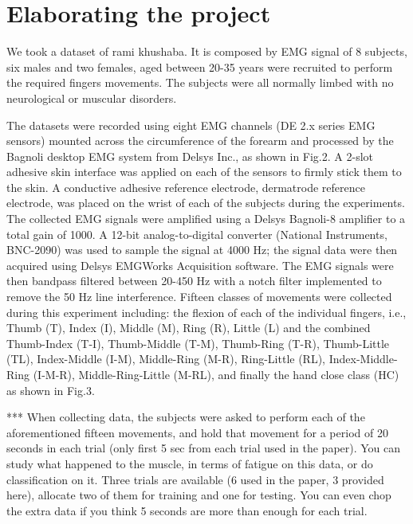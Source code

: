 \documentclass[journal]{IEEEtran}
\begin{document}
\section{Elaborating the project}
We took a dataset of rami khushaba. It is composed by EMG signal of 8 subjects, six males and two females, aged between 20-35 years were recruited to perform the required fingers movements. The subjects were all normally limbed with no neurological or muscular disorders. 

The datasets were recorded using eight EMG channels (DE 2.x series EMG sensors) mounted across the circumference of the forearm and processed by the Bagnoli desktop EMG system from Delsys Inc., as shown in Fig.2. A 2-slot adhesive skin interface was applied on each of the sensors to firmly stick them to the skin. A conductive adhesive reference electrode, dermatrode reference electrode, was placed on the wrist of each of the subjects during the experiments. The collected EMG signals were amplified using a Delsys Bagnoli-8 amplifier to a total gain of 1000. A 12-bit analog-to-digital converter (National Instruments, BNC-2090) was used to sample the signal at 4000 Hz; the signal data were then acquired using Delsys EMGWorks Acquisition software. The EMG signals were then bandpass filtered between 20-450 Hz with a notch filter implemented to remove the 50 Hz line interference. Fifteen classes of movements were collected during this experiment including: the flexion of each of the individual fingers, i.e., Thumb (T), Index (I), Middle (M), Ring (R), Little (L) and the combined Thumb-Index (T-I), Thumb-Middle (T-M), Thumb-Ring (T-R), Thumb-Little (TL), Index-Middle (I-M), Middle-Ring (M-R), Ring-Little (RL), Index-Middle-Ring (I-M-R), Middle-Ring-Little (M-RL), and finally the hand close class (HC) as shown in Fig.3. 

*** When collecting data, the subjects were asked to perform each of the aforementioned fifteen movements, and hold that movement for a period of 20 seconds in each trial (only first 5 sec from each trial used in the paper). You can study what happened to the muscle, in terms of fatigue on this data, or do classification on it. Three trials are available (6 used in the paper, 3 provided here), allocate two of them for training and one for testing. You can even chop the extra data if you think 5 seconds are more than enough for each trial.
\end{document}
